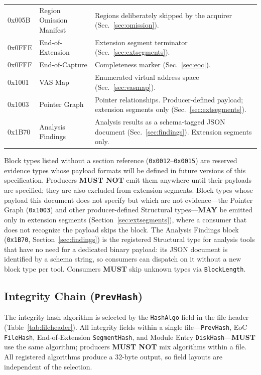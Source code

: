 \documentclass[11pt,a4paper]{article}
\newcommand{\MUST}{\textbf{MUST}}
\newcommand{\MUSTNOT}{\textbf{MUST NOT}}
\newcommand{\MAY}{\textbf{MAY}}
\newcommand{\hex}[1]{\texttt{0x#1}}
\newcommand{\field}[1]{\texttt{#1}}
\begin{document}
\begin{table}[H]
\begin{tabular}{M l p{6.5cm}}
0x005B & Region Omission Manifest & Regions deliberately skipped by the acquirer (Sec.~\ref{sec:omission}). \\
0x0FFE & End-of-Extension & Extension segment terminator (Sec.~\ref{sec:extsegments}). \\
0x0FFF & End-of-Capture & Completeness marker (Sec.~\ref{sec:eoc}). \\\midrule
0x1001 & VAS Map & Enumerated virtual address space (Sec.~\ref{sec:vasmap}). \\
0x1003 & Pointer Graph & Pointer relationships. Producer-defined payload; extension segments only (Sec.~\ref{sec:extsegments}). \\
0x1B70 & Analysis Findings & Analysis results as a schema-tagged JSON document (Sec.~\ref{sec:findings}). Extension segments only. \\\bottomrule
\end{tabular}\end{table}

\noindent Block types listed without a section reference (\hex{0012}--\hex{0015}) are reserved evidence types whose payload formats will be defined in future versions of this specification. Producers \MUSTNOT{} emit them anywhere until their payloads are specified; they are also excluded from extension segments. Block types whose payload this document does not specify but which are not evidence---the Pointer Graph (\hex{1003}) and other producer-defined Structural types---\MAY{} be emitted only in extension segments (Section~\ref{sec:extsegments}), where a consumer that does not recognize the payload skips the block. The Analysis Findings block (\hex{1B70}, Section~\ref{sec:findings}) is the registered Structural type for analysis tools that have no need for a dedicated binary payload: its JSON document is identified by a schema string, so consumers can dispatch on it without a new block type per tool. Consumers \MUST{} skip unknown types via \field{BlockLength}.

\subsection{Integrity Chain (\field{PrevHash})}\label{sec:hashchain}
The integrity hash algorithm is selected by the \field{HashAlgo} field in the file header (Table~\ref{tab:fileheader}). All integrity fields within a single file---\field{PrevHash}, EoC \field{FileHash}, End-of-Extension \field{SegmentHash}, and Module Entry \field{DiskHash}---\MUST{} use the same algorithm; producers \MUSTNOT{} mix algorithms within a file. All registered algorithms produce a 32-byte output, so field layouts are independent of the selection.
\end{document}
